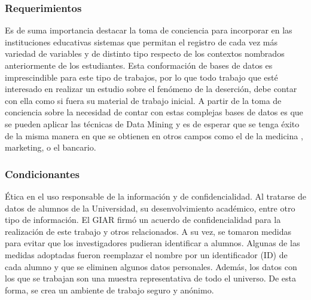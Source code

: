 
\subsubsection{Requerimientos}
Es de suma importancia destacar la toma de conciencia para incorporar en las instituciones educativas sistemas que permitan el registro de cada vez más variedad de variables y de distinto tipo respecto de los contextos nombrados anteriormente de los estudiantes.
Esta conformación de bases de datos es imprescindible para este tipo de trabajos, por lo que todo trabajo que esté interesado en realizar un estudio sobre el fenómeno de la deserción, debe contar con ella como si fuera su material de trabajo inicial.
A partir de la toma de conciencia sobre la necesidad de contar con estas complejas bases de datos es que se pueden aplicar las técnicas de Data Mining y es de esperar que se tenga éxito de la misma manera en que se obtienen en otros campos como el de la medicina \cite{Adnan2013DataReview}, marketing, o el bancario\cite{Kirkos2007DataStatements}.


\subsubsection{Condicionantes}\label{seccion:condicionantes}
Ética en el uso responsable de la información y de confidencialidad.
Al tratarse de datos de alumnos de la Universidad, su desenvolvimiento académico, entre otro tipo de información. El GIAR  firmó un acuerdo de confidencialidad para la realización de este trabajo y otros relacionados. A su vez, se tomaron medidas para evitar que los investigadores pudieran identificar a alumnos. Algunas de las medidas adoptadas fueron reemplazar el nombre por un identificador (ID) de cada alumno y que se
eliminen algunos datos personales.
Además, los datos con los que se trabajan son una muestra representativa de todo el universo.
De esta forma, se crea un ambiente de trabajo seguro y anónimo.
